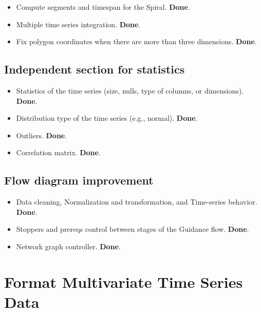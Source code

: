 \documentclass[a4paper]{article}
\begin{document}
\begin{itemize}
\item Compute segments and timespan for the Spiral. \textbf{Done}.

\item Multiple time series integration. \textbf{Done}.

\item Fix polygon coordinates when there are more than three dimensions. \textbf{Done}.
\end{itemize}

\subsection{Independent section for statistics}
\label{sec:org6e65b70}

\begin{itemize}
\item Statistics of the time series (size, nulls, type of columns, or dimensions). \textbf{Done}.

\item Distribution type of the time series (e.g., normal). \textbf{Done}.

\item Outliers. \textbf{Done}.

\item Correlation matrix. \textbf{Done}.
\end{itemize}

\subsection{Flow diagram improvement}
\label{sec:orgb70445b}

\begin{itemize}
\item Data cleaning, Normalization and transformation, and Time-series behavior. \textbf{Done}.

\item Stoppers and prereqs control between stages of the Guidance flow. \textbf{Done}.

\item Network graph controller. \textbf{Done}.
\end{itemize}

\section{Format Multivariate Time Series Data}
\label{sec:orgecd0a00}
\end{document}
